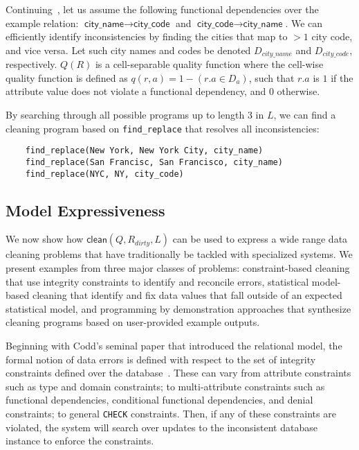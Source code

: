 \begin{example}\label{ex3}
Continuing~, let us assume the following functional dependencies over the example relation: $\textsf{city\_name} \rightarrow \textsf{city\_code}$ and $\textsf{city\_code} \rightarrow \textsf{city\_name}$.
We can efficiently identify inconsistencies by finding the cities that map to $>1$ city code, and vice versa.   Let such city names and codes be denoted $D_{city\_name}$ and $D_{city\_code}$, respectively.
$Q(R)$ is a cell-separable quality function where the cell-wise quality function is defined as $q(r, a) = 1 - (r.a \in D_a)$, such that $r.a$ is $1$ if the attribute value does not violate a functional dependency, and $0$ otherwise.

By searching through all possible programs up to length 3 in $L$, we can find a cleaning program based on \texttt{find\_replace} that resolves all inconsistencies:
\begin{lstlisting}
    find_replace(New York, New York City, city_name)
    find_replace(San Francisc, San Francisco, city_name)
    find_replace(NYC, NY, city_code)
\end{lstlisting}
\end{example}


\subsection{Model Expressiveness}
We now show how $\textsf{clean}(Q,R_{dirty},L)$ can be used to express a wide range data cleaning problems that have traditionally be tackled with specialized systems.  We present examples from three major classes of problems: constraint-based cleaning that use integrity constraints to identify and reconcile errors, statistical model-based  cleaning that identify and fix data values that fall outside of an expected statistical model, and programming by demonstration approaches that synthesize cleaning programs based on user-provided example outputs.  

Beginning with Codd's seminal paper that introduced the relational model, the formal notion of data errors is defined with respect to the set of integrity constraints defined over the database~\cite{codd1970relational}.   These can vary from attribute constraints such as type and domain constraints; to multi-attribute constraints such as functional dependencies, conditional functional dependencies, and denial constraints; to general \texttt{CHECK} constraints.   
Then, if any of these constraints are violated, the system will search over updates to the inconsistent database instance to enforce the constraints.

